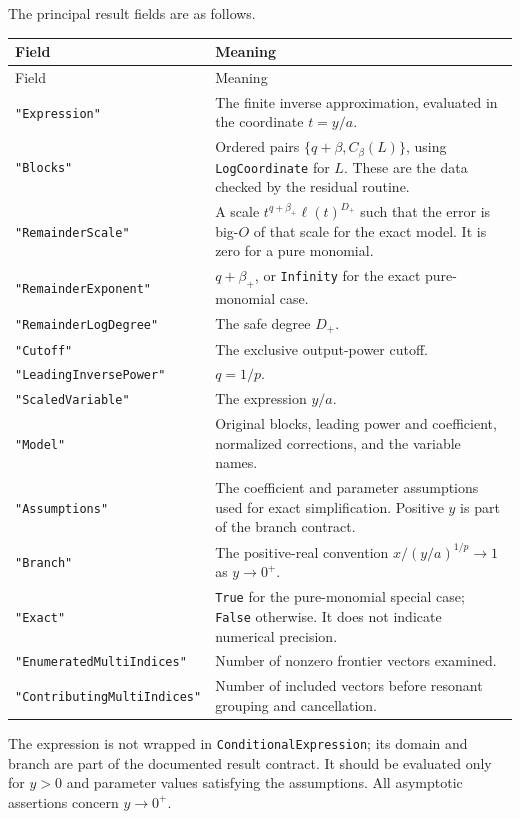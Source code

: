 \documentclass[11pt,a4paper]{article}
\numberwithin{equation}{section}
\theoremstyle{definition}
\newcommand{\code}[1]{\texttt{#1}}
\begin{document}
The principal result fields are as follows.
\begin{longtable}{@{}p{}p{}@{}}
\toprule
Field & Meaning\\\midrule
\endfirsthead
\toprule Field & Meaning\\\midrule\endhead
\code{"Expression"} & The finite inverse approximation, evaluated in the
coordinate $t=y/a$.\\[3pt]
\code{"Blocks"} & Ordered pairs $\{q+\beta,C_\beta(L)\}$, using
\code{LogCoordinate} for $L$. These are the data checked by the residual
routine.\\[3pt]
\code{"RemainderScale"} & A scale $t^{q+\beta_+}\ell(t)^{D_+}$ such that
the error is big-$O$ of that scale for the exact model. It is zero for a
pure monomial.\\[3pt]
\code{"RemainderExponent"} & $q+\beta_+$, or \code{Infinity} for the exact
pure-monomial case.\\[3pt]
\code{"RemainderLogDegree"} & The safe degree $D_+$.\\[3pt]
\code{"Cutoff"} & The exclusive output-power cutoff.\\[3pt]
\code{"LeadingInversePower"} & $q=1/p$.\\[3pt]
\code{"ScaledVariable"} & The expression $y/a$.\\[3pt]
\code{"Model"} & Original blocks, leading power and coefficient,
normalized corrections, and the variable names.\\[3pt]
\code{"Assumptions"} & The coefficient and parameter assumptions used
for exact simplification. Positive $y$ is part of the branch contract.\\[3pt]
\code{"Branch"} & The positive-real convention
$x/(y/a)^{1/p}\to1$ as $y\to0^+$.\\[3pt]
\code{"Exact"} & \code{True} for the pure-monomial special case;
\code{False} otherwise. It does not indicate numerical precision.\\[3pt]
\code{"EnumeratedMultiIndices"} & Number of nonzero frontier vectors
examined.\\[3pt]
\code{"ContributingMultiIndices"} & Number of included vectors before
resonant grouping and cancellation.\\
\bottomrule
\end{longtable}
The expression is not wrapped in \code{ConditionalExpression}; its domain
and branch are part of the documented result contract. It should be
evaluated only for $y>0$ and parameter values satisfying the assumptions.
All asymptotic assertions concern $y\to0^+$.
\end{document}
